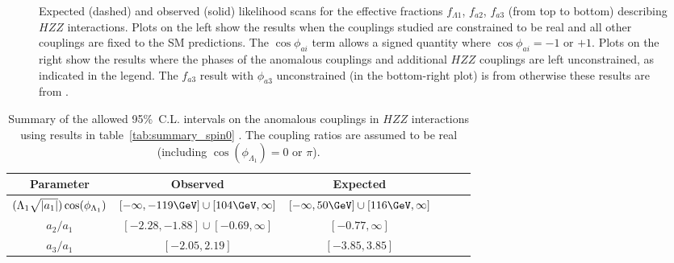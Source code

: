 \begin{figure}
	\caption[Expected (dashed) and observed (solid) likelihood scans for
	the effective fractions $f_{\Lambda1}$, $f_{a2}$, $f_{a3}$ (from top to bottom) describing $HZZ$ interactions.
	Plots on the left show the results when the couplings studied are constrained to be real and all other couplings are fixed to the SM predictions.
	The $\cos\phi_{ai}$ term allows a signed quantity where $\cos\phi_{ai}=-1$ or $+1$.
	Plots on the right show the results where the phases of the anomalous couplings and
	additional $HZZ$ couplings are left unconstrained, as indicated in the legend.]{
	Expected (dashed) and observed (solid) likelihood scans for
	the effective fractions $f_{\Lambda1}$, $f_{a2}$, $f_{a3}$ (from top to bottom) describing $HZZ$ interactions.
	Plots on the left show the results when the couplings studied are constrained to be real and all other couplings are fixed to the SM predictions.
	The $\cos\phi_{ai}$ term allows a signed quantity where $\cos\phi_{ai}=-1$ or $+1$.
	Plots on the right show the results where the phases of the anomalous couplings and
	additional $HZZ$ couplings are left unconstrained, as indicated in the legend.
	The $f_{a3}$ result with $\phi_{a3}$ unconstrained (in the bottom-right plot) is from \cite{Chatrchyan:2013mxa} otherwise these results are from \cite{Khachatryan:2014kca}.
	}
	\label{fig:results_ZZ_1D}

\end{figure}

\begin{table}
\centering
\caption[Summary of the allowed 95\%~C.L. intervals on the anomalous couplings in $HZZ$ interactions
using results in table~\ref{tab:summary_spin0}.
The coupling ratios are assumed to be real (including $\cos(\phi_{\Lambda_{1}})=0$ or $\pi$).]{
Summary of the allowed 95\%~C.L. intervals on the anomalous couplings in $HZZ$ interactions
using results in table~\ref{tab:summary_spin0} \cite{Khachatryan:2014kca}.
The coupling ratios are assumed to be real (including $\cos(\phi_{\Lambda_{1}})=0$ or $\pi$).
\label{tab:Spin0zz_interpretation}
}
\begin{tabular}{cccccc}
Parameter  & Observed & Expected    \\
\hline

$(\Lambda_{1}\sqrt{\abs{a_1}}) \cos(\phi_{\Lambda_{1}})$ &   $[-\infty,-119\GeV]\cup[104\GeV,\infty]$ & $[-\infty,50\GeV] \cup [116\GeV,\infty]$                                            \\

$ a_{2}/a_{1} $ &   $[-2.28,-1.88]\cup[-0.69,\infty]$ & $[-0.77,\infty]$                                               \\

$ a_{3}/a_{1} $ &   $[-2.05,2.19]$ & $[-3.85,3.85]$                                               \\
\end{tabular}
\end{table}

